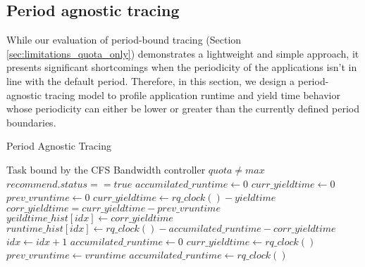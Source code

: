 


\subsection{Period agnostic tracing}
While our evaluation of period-bound tracing (Section \ref{sec:limitations_quota_only}) demonstrates a lightweight and simple approach, it presents significant shortcomings when the periodicity of the applications isn't in line with the default period. Therefore, in this section, we design a period-agnostic tracing model to profile application runtime and yield time behavior whose periodicity can either be lower or greater than the currently defined period boundaries.

\begin{algorithm}
\caption{Period Agnostic Tracing}\label{alg:pat}
\begin{algorithmic}
\Require Task bound by the CFS Bandwidth controller
\Require $quota \ne max$
\Require $recommend.status == true$
\State $accumilated\_runtime \gets 0$
\State $curr\_yieldtime \gets 0$
\State $prev\_vruntime\gets 0$
    \State $curr\_yieldtime \gets rq\_clock() - yieldtime$
\EndIf
\State $corr\_yieldtime = curr\_yieldtime - prev\_vruntime$
    \State $ yeildtime\_hist[idx] \gets corr\_yieldtime$
    \State $ runtime\_hist[idx] \gets rq\_clock() - accumilated\_runtime - corr\_yieldtime$
    \State $ idx \gets idx + 1$
    \State $ accumilated\_runtime \gets 0$
\EndIf
\State $curr\_yieldtime \gets rq\_clock() $
\State $prev\_vruntime\gets vruntime $
    \State $accumilated\_runtime \gets rq\_clock() $
\EndIf
\EndWhile
\end{algorithmic}
\end{algorithm}

